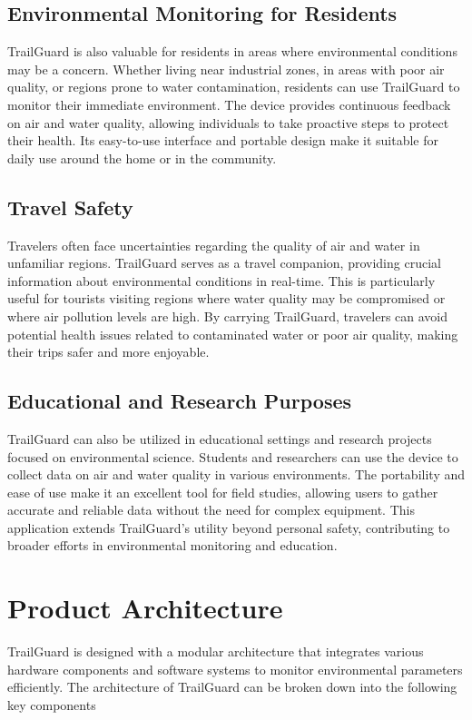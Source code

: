 \documentclass[a4paper,11pt]{article}%
\begin{document}
\subsection{Environmental Monitoring for Residents}
TrailGuard is also valuable for residents in areas where environmental conditions may be a concern. Whether living near industrial zones, in areas with poor air quality, or regions prone to water contamination, residents can use TrailGuard to monitor their immediate environment. The device provides continuous feedback on air and water quality, allowing individuals to take proactive steps to protect their health. Its easy-to-use interface and portable design make it suitable for daily use around the home or in the community.

\subsection{Travel Safety}
Travelers often face uncertainties regarding the quality of air and water in unfamiliar regions. TrailGuard serves as a travel companion, providing crucial information about environmental conditions in real-time. This is particularly useful for tourists visiting regions where water quality may be compromised or where air pollution levels are high. By carrying TrailGuard, travelers can avoid potential health issues related to contaminated water or poor air quality, making their trips safer and more enjoyable.

\subsection{Educational and Research Purposes}
TrailGuard can also be utilized in educational settings and research projects focused on environmental science. Students and researchers can use the device to collect data on air and water quality in various environments. The portability and ease of use make it an excellent tool for field studies, allowing users to gather accurate and reliable data without the need for complex equipment. This application extends TrailGuard’s utility beyond personal safety, contributing to broader efforts in environmental monitoring and education.

\newpage
\section{Product Architecture}
TrailGuard is designed with a modular architecture that integrates various hardware components and software systems to monitor environmental parameters efficiently. The architecture of TrailGuard can be broken down into the following key components
\end{document}

